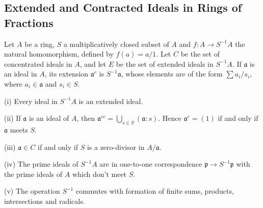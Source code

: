 \subsection{Extended and Contracted Ideals in Rings of Fractions}
Let $A$ be a ring, $S$ a multiplicatively closed subset of $A$ and $f:A\to S^{-1}A$ the natural homomorphism, defined by $f(a)=a/1$. Let $C$ be the set of concentrated ideals in $A$, and let $E$ be the set of extended ideals in $S^{-1}A$. If $\mathfrak{a}$ is an ideal in $A$, its extension $\mathfrak{a}^e$ is $S^{-1}\mathfrak{a}$, whose elements are of the form $\sum a_i/s_i$, where $a_i\in\mathfrak{a}$ and $s_i\in S$.
\begin{proposition}
(i) Every ideal in $S^{-1}A$ is an extended ideal.\par
(ii) If $\mathfrak{a}$ is an ideal of $A$, then $\mathfrak{a}^{ec}=\bigcup_{s\in S}(\mathfrak{a}:s)$. Hence $\mathfrak{a}^e=(1)$ if and only if $\mathfrak{a}$ meets $S$.\par
(iii) $\mathfrak{a}\in C$ if and only if $S$ is a zero-divisor in $A/\mathfrak{a}$.\par
(iv) The prime ideals of $S^{-1}A$ are in one-to-one correspondence $\mathfrak{p}\to S^{-1}\mathfrak{p}$ with the prime ideals of $A$ which don't meet $S$.\par
(v) The operation $S^{-1}$ commutes with formation of finite sums, products, intersections and radicals.
\end{proposition}
